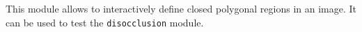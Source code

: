 This module allows to interactively define closed polygonal regions in an
image. It can be used to test the \verb+disocclusion+ module.